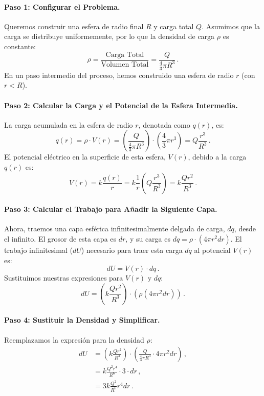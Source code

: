 \documentclass[11pt,a4paper]{book}
\begin{document}
\paragraph{Paso 1: Configurar el Problema.}
Queremos construir una esfera de radio final $R$ y carga total $Q$. Asumimos que la carga se distribuye uniformemente, por lo que la densidad de carga $\rho$ es constante:
\begin{equation}
    \rho = \frac{\text{Carga Total}}{\text{Volumen Total}} = \frac{Q}{\frac{4}{3}\pi R^3}\,.
\end{equation}
En un paso intermedio del proceso, hemos construido una esfera de radio $r$ (con $r < R$).

\paragraph{Paso 2: Calcular la Carga y el Potencial de la Esfera Intermedia.}
La carga acumulada en la esfera de radio $r$, denotada como $q(r)$, es:
\begin{equation}
    q(r) = \rho \cdot V(r) = \left( \frac{Q}{\frac{4}{3}\pi R^3} \right) \cdot \left( \frac{4}{3}\pi r^3 \right) = Q \frac{r^3}{R^3}\,.
\end{equation}
El potencial eléctrico en la superficie de esta esfera, $V(r)$, debido a la carga $q(r)$ es:
\begin{equation}
    V(r) = k \frac{q(r)}{r} = k \frac{1}{r} \left( Q \frac{r^3}{R^3} \right) = k \frac{Q r^2}{R^3}\,.
\end{equation}

\paragraph{Paso 3: Calcular el Trabajo para Añadir la Siguiente Capa.}
Ahora, traemos una capa esférica infinitesimalmente delgada de carga, $dq$, desde el infinito. El grosor de esta capa es $dr$, y su carga es $dq = \rho \cdot (4\pi r^2 dr)$. El trabajo infinitesimal ($dU$) necesario para traer esta carga $dq$ al potencial $V(r)$ es:
\begin{equation}
    dU = V(r) \cdot dq\,.
\end{equation}
Sustituimos nuestras expresiones para $V(r)$ y $dq$:
\[
    dU = \left( k \frac{Q r^2}{R^3} \right) \cdot \left( \rho (4\pi r^2 dr) \right)\,.
\]

\paragraph{Paso 4: Sustituir la Densidad y Simplificar.}
Reemplazamos la expresión para la densidad $\rho$:
\begin{align*}
    dU &= \left( k \frac{Q r^2}{R^3} \right) \cdot \left( \frac{Q}{\frac{4}{3}\pi R^3} \cdot 4\pi r^2 dr \right)\,, \\
       &= k \frac{Q^2 r^4}{R^6} \cdot 3 \cdot dr\,, \\
       &= 3k \frac{Q^2}{R^6} r^4 dr\,.
\end{align*}
\end{document}
